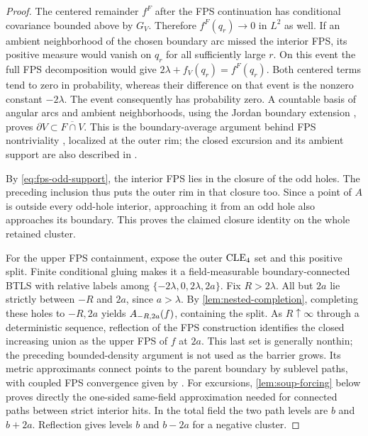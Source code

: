 \begin{proof}
The centered remainder \(f^F\) after the FPS continuation has
conditional covariance bounded above by $G_V$. Therefore
\(f^F(q_r)\to0\) in \(L^2\) as well. If an ambient neighborhood of
the chosen boundary arc missed the interior FPS, its positive measure
would vanish on $q_r$ for all sufficiently large $r$. On this event
the full FPS decomposition would give
\(2\lambda+f_V(q_r)=f^F(q_r)\).
Both centered terms tend to zero in probability, whereas their
difference on that event is the nonzero constant $-2\lambda$.
The event consequently has probability zero. A countable basis of
angular arcs and ambient neighborhoods, using the Jordan boundary
extension \cite[Chapter~I, Theorem~3.1]{GarnettMarshall2005}, proves
\(\partial V\subset\overline{F\cap V}\).
This is the boundary-average argument behind FPS nontriviality
\cite[Proposition~4.6]{ALS2017}, localized at the outer rim;
the closed excursion and its ambient support are also described in
\cite[Theorem~1 and Section~3]{ALS2023}.

By \cref{eq:fps-odd-support}, the interior FPS lies in the closure
of the odd holes. The preceding inclusion thus puts the outer rim
in that closure too. Since a point of $A$ is outside every odd-hole
interior, approaching it from an odd hole also approaches its
boundary. This proves the claimed closure identity on the whole
retained cluster.

For the upper FPS containment, expose the outer \(\mathrm{CLE}_4\) set and
this positive split. Finite conditional gluing makes it a
field-measurable boundary-connected BTLS with relative labels among
\(\{-2\lambda,0,2\lambda,2a\}\). Fix \(R>2\lambda\).
All but \(2a\) lie strictly between \(-R\) and \(2a\), since
\(a>\lambda\). By \cref{lem:nested-completion}, completing these
holes to \(-R,2a\) yields \(A_{-R,2a}(f)\), containing the split.
As \(R\uparrow\infty\) through a deterministic sequence, reflection of
the FPS construction
\cite[Remark~4.2 and Proposition~4.4]{ALS2017} identifies the closed
increasing union as the upper FPS of \(f\) at \(2a\). This last set
is generally nonthin; the preceding bounded-density argument is not
used as the barrier grows. Its metric approximants connect points to
the parent boundary by sublevel paths, with coupled FPS convergence
given by \cite[Proposition~4.7]{ALS2018}.
For excursions, \cref{lem:soup-forcing} below proves directly the
one-sided same-field approximation needed for connected paths between
strict interior hits. In the total field the two path levels are
\(b\) and \(b+2a\).
Reflection gives levels \(b\) and \(b-2a\) for a negative cluster.


\end{proof}
